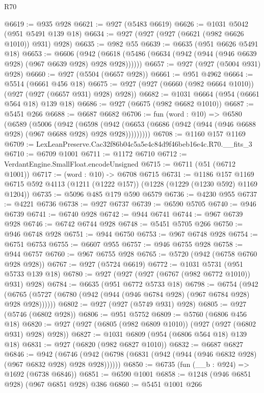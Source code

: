 \begin{lexlean}{R70}
\begin{coremodule}
@6619 := @935 @928
@6621 := @927 (@5483 @6619)
@6626 := @1031 @5042 (@951 @5491 @139 @18)
@6634 := @927 (@927 (@927 (@6621 (@982 @6626 @1010)) @931) @928)
@6635 := @982 @55
@6639 := @6635 (@951 @6626 @5491 @18)
@6653 := @6606
    (@942 (@6618 (@5486 (@6634 (@942 (@944 (@946 @6639 @928) (@967 @6639 @928) @928 @928))))))
@6657 := @927 (@927 (@5004 @931) @928)
@6660 := @927 (@5504 (@6657 @928))
@6661 := @951 @4962
@6664 := @5514 (@6661 @456 @18)
@6675 := @927 (@927 (@6660 (@982 @6664 @1010)) (@927 (@927 (@6657 @931) @928) @928))
@6682 := @1031 @6664 (@954 (@6661 @564 @18) @139 @18)
@6686 := @927 (@6675 (@982 @6682 @1010))
@6687 := @5451 @266
@6688 := @6687 @6682
@6706 := fun (word : @10) =>
  @6580
    (@6589
      (@5006
        (@942
          (@6598
            (@942 (@6653 (@6686 (@942 (@944 (@946 @6688 @928) (@967 @6688 @928) @928 @928)))))))))
@6708 := @1160 @157 @1169
@6709 := LexLeanPreserve.Cac32f86b04c5a5e4c84d9f46beb16e4c.R70.__fits_3
@6710 := @6709 @1001
@6711 := @1172 @6710
@6712 := VerdantEngine.SmallFloat.encodeUnsigned
@6715 := @6711 (@51 (@6712 @1001))
@6717 := (word : @10) -> @6708 @6715
@6731 := @1186
    @157
    @1169
    @6715
    @592
    @4113
    (@1211 (@1222 @157))
    (@1228 (@1229 (@1230 @592) @1169 @1204))
@6735 := @5096 @485 @179 @590 @6579
@6736 := @4230 @955
@6737 := @4221 @6736
@6738 := @927 @6737
@6739 := @6590 @5705
@6740 := @946 @6739
@6741 := @6740 @928
@6742 := @944 @6741
@6744 := @967 @6739 @928
@6746 := @6742 @6744 @928
@6748 := @5451 @5705 @266
@6750 := @946 @6748 @928
@6751 := @944 @6750
@6753 := @967 @6748 @928
@6754 := @6751 @6753
@6755 := @6607 @955
@6757 := @946 @6755 @928
@6758 := @944 @6757
@6760 := @967 @6755 @928
@6765 := @5720 (@942 (@6758 @6760 @928 @928))
@6767 := @927 (@5724 @6619)
@6772 := @1031 @5731 (@951 @5733 @139 @18)
@6780 := @927 (@927 (@927 (@6767 (@982 @6772 @1010)) @931) @928)
@6784 := @6635 (@951 @6772 @5733 @18)
@6798 := @6754
    (@942 (@6765 (@5727 (@6780 (@942 (@944 (@946 @6784 @928) (@967 @6784 @928) @928 @928))))))
@6802 := @927 (@927 (@5749 @931) @928)
@6805 := @927 (@5746 (@6802 @928))
@6806 := @951 @5752
@6809 := @5760 (@6806 @456 @18)
@6820 := @927 (@927 (@6805 (@982 @6809 @1010)) (@927 (@927 (@6802 @931) @928) @928))
@6827 := @1031 @6809 (@954 (@6806 @564 @18) @139 @18)
@6831 := @927 (@6820 (@982 @6827 @1010))
@6832 := @6687 @6827
@6846 := @942
    (@6746 (@942 (@6798 (@6831 (@942 (@944 (@946 @6832 @928) (@967 @6832 @928) @928 @928))))))
@6850 := @6735 (fun (__b : @924) => @1692 (@6738 @6846))
@6851 := @6590 @1001
@6858 := @1248 (@946 @6851 @928) (@967 @6851 @928) @386
@6860 := @5451 @1001 @266

\end{coremodule}
\end{lexlean}
